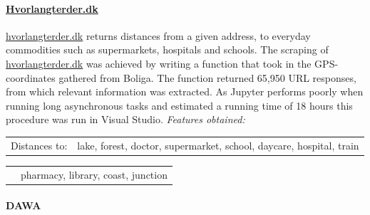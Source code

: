\documentclass[12pt,a4paper]{article}
\begin{document}
\paragraph{\href{https://www.hvorlangterder.dk}{Hvorlangterder.dk}\newline}
\href{https://www.hvorlangterder.dk}{hvorlangterder.dk} returns distances from a given address, to everyday commodities such as supermarkets, hospitals and schools.   
The scraping of \href{https://www.hvorlangterder.dk}{hvorlangterder.dk} was achieved by writing a function that took in the GPS-coordinates gathered from Boliga. The function returned 65,950 URL responses, from which relevant information was extracted.\newline
As Jupyter performs poorly when running long asynchronous tasks and estimated a running time of 18 hours this procedure was run in Visual Studio.
 \vspace*{10px} \newline
\textit{Features obtained:}\newline
\begin{tabular}{c c}
Distances to: & lake, forest, doctor, supermarket,	school, daycare, hospital, train \\	
\end{tabular}\newline 
\begin{tabular}{c c}
\qquad \qquad \qquad \qquad &  pharmacy, library, coast, junction \\	
\end{tabular}

\paragraph{DAWA\newline}
\end{document}
